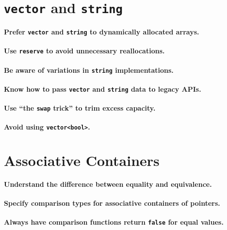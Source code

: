 \documentclass{article}
\begin{document}
\section{{\tt vector} and {\tt string}}

\paragraph{Prefer {\tt vector} and {\tt string} to dynamically allocated arrays.}

\paragraph{Use {\tt reserve} to avoid unnecessary reallocations.}

\paragraph{Be aware of variations in {\tt string} implementations.}

\paragraph{Know how to pass {\tt vector} and {\tt string} data to legacy APIs.}

\paragraph{Use ``the {\tt swap} trick'' to trim excess capacity.}

\paragraph{Avoid using {\tt vector<bool>}.}

\section{Associative Containers}

\paragraph{Understand the difference between equality and equivalence.}
\paragraph{Specify comparison types for associative containers of pointers.}
\paragraph{Always have comparison functions return {\tt false} for equal values.}
\end{document}
